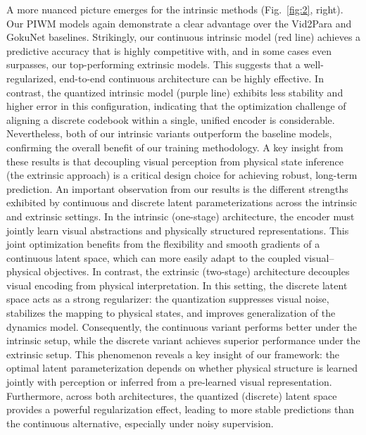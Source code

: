 \documentclass[sigconf]{acmart}
\begin{document}
A more nuanced picture emerges for the intrinsic methods (Fig.~\ref{fig:2}, right). Our PIWM models again demonstrate a clear advantage over the Vid2Para and GokuNet baselines. Strikingly, our continuous intrinsic model (red line) achieves a predictive accuracy that is highly competitive with, and in some cases even surpasses, our top-performing extrinsic models. This suggests that a well-regularized, end-to-end continuous architecture can be highly effective. In contrast, the quantized intrinsic model (purple line) exhibits less stability and higher error in this configuration, indicating that the optimization challenge of aligning a discrete codebook within a single, unified encoder is considerable. Nevertheless, both of our intrinsic variants outperform the baseline models, confirming the overall benefit of our training methodology.
A key insight from these results is that {decoupling visual perception from physical state inference (the extrinsic approach) is a critical design choice for achieving robust, long-term prediction.} An important observation from our results is the different strengths exhibited by continuous and discrete latent parameterizations across the intrinsic and extrinsic settings. In the intrinsic (one-stage) architecture, the encoder must jointly learn visual abstractions and physically structured representations. This joint optimization benefits from the flexibility and smooth gradients of a continuous latent space, which can more easily adapt to the coupled visual–physical objectives. In contrast, the extrinsic (two-stage) architecture decouples visual encoding from physical interpretation. In this setting, the discrete latent space acts as a strong regularizer: the quantization suppresses visual noise, stabilizes the mapping to physical states, and improves generalization of the dynamics model. Consequently, the continuous variant performs better under the intrinsic setup, while the discrete variant achieves superior performance under the extrinsic setup. This phenomenon reveals a key insight of our framework: the optimal latent parameterization depends on whether physical structure is learned jointly with perception or inferred from a pre-learned visual representation.
Furthermore, across both architectures, the quantized (discrete) latent space provides a powerful regularization effect, leading to more stable predictions than the continuous alternative, especially under noisy supervision.






\end{document}
